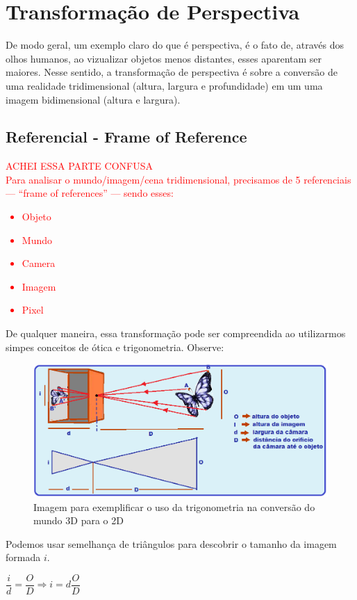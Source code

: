 \documentclass[a4paper, 12pt]{article}
\begin{document}
\section{Transformação de Perspectiva}
De modo geral, um exemplo claro do que é perspectiva, é o fato de, através dos olhos humanos, ao vizualizar objetos menos distantes, 
esses aparentam ser maiores. Nesse sentido, a transformação de perspectiva é sobre a conversão de uma realidade tridimensional 
(altura, largura e profundidade) em um uma imagem bidimensional (altura e largura).

\subsection{Referencial - Frame of Reference}
\textcolor{red}{
	\large{ACHEI ESSA PARTE CONFUSA}
	\\
	Para analisar o mundo/imagem/cena tridimensional, precisamos de 5 referenciais --- ``frame of references'' --- sendo esses:
\begin{itemize}
	\item Objeto
	\item Mundo
 	\item Camera
 	\item Imagem
 	\item Pixel
\end{itemize}
}
\newpage
De qualquer maneira, essa transformação pode ser compreendida ao utilizarmos simpes conceitos de ótica e trigonometria. Observe:
\begin{figure}[!htbp]
	\includegraphics[scale=0.5]{images/otica.png}
	\caption{Imagem para exemplificar o uso da trigonometria na conversão do mundo 3D para o 2D}
\end{figure}
Podemos usar semelhança de triângulos para descobrir o tamanho da imagem formada $i$.
\begin{center}
	$\dfrac{i}{d} = \dfrac{O}{D} \Rightarrow i = d \dfrac{O}{D}$
\end{center}
\end{document}

